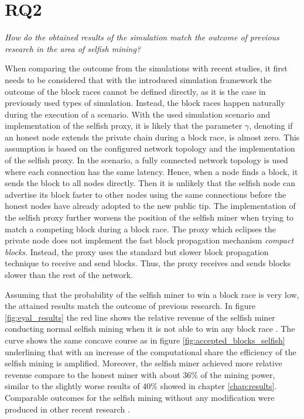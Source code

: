 \section{RQ2}

\textit{How do the obtained results of the simulation match the outcome of previous research in the area of selfish mining?}

When comparing the outcome from the simulations with recent studies, it first needs to be considered that with the introduced simulation framework the outcome of the block races cannot be defined directly, as it is the case in previously used types of simulation.
Instead, the block races happen naturally during the execution of a scenario.
With the used simulation scenario and implementation of the selfish proxy, it is likely that the parameter $\gamma$, denoting if an honest node extends the private chain during a block race, is almost zero.
This assumption is based on the configured network topology and the implementation of the selfish proxy.
In the scenario, a fully connected network topology is used where each connection has the same latency.
Hence, when a node finds a block, it sends the block to all nodes directly.
Then it is unlikely that the selfish node can advertise its block faster to other nodes using the same connections before the honest nodes have already adopted to the new public tip.
The implementation of the selfish proxy further worsens the position of the selfish miner when trying to match a competing block during a block race.
The proxy which eclipses the private node does not implement the fast block propagation mechanism \textit{compact blocks}.
Instead, the proxy uses the standard but slower block propagation technique to receive and send blocks.
Thus, the proxy receives and sends blocks slower than the rest of the network.

Assuming that the probability of the selfish miner to win a block race is very low, the attained results match the outcome of previous research.
In figure \ref{fig:eyal_results} the red line shows the relative revenue of the selfish miner conducting normal selfish mining when it is not able to win any block race \cite{eyal2014majority}.
The curve shows the same concave course as in figure \ref{fig:accepted_blocks_selfish} underlining that with an increase of the computational share the efficiency of the selfish mining is amplified.
Moreover, the selfish miner achieved more relative revenue compare to the honest miner with about 36\% of the mining power, similar to the slightly worse results of 40\% showed in chapter \ref{chap:results}.
Comparable outcomes for the selfish mining without any modification were produced in other recent research \cite{nayak2016stubborn, sapirshtein2016optimal}.

